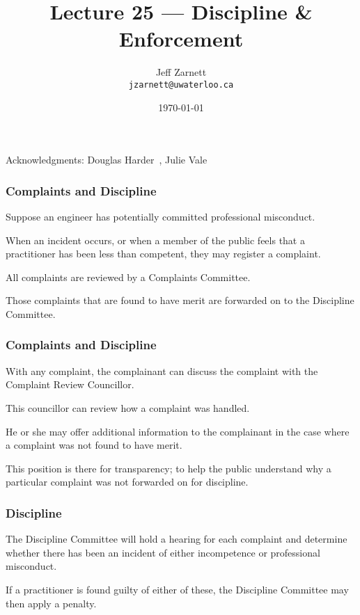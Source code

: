 

\title{Lecture 25 --- Discipline \& Enforcement}

\author{Jeff Zarnett \\ \small \texttt{jzarnett@uwaterloo.ca}}
\date{\today}




\begin{frame}
  \titlepage

\begin{center}
  \small{Acknowledgments: Douglas Harder~\cite{dwh}, Julie Vale~\cite{jv}}
  \end{center}
\end{frame}




\begin{frame}
\frametitle{Complaints and Discipline}

Suppose an engineer has potentially committed professional misconduct.

When an incident occurs, or when a member of the public feels that a practitioner has been less than competent, they may register a complaint.

All complaints are reviewed by a Complaints Committee.

Those complaints that are found to have merit are forwarded on to the Discipline Committee.

\end{frame}



\begin{frame}
\frametitle{Complaints and Discipline}

With any complaint, the complainant can discuss the complaint with the Complaint Review Councillor.

This councillor can review how a complaint was handled.

He or she may offer additional information to the complainant in the case where a complaint was not found to have merit.

This position is there for transparency; to help the public understand why a particular complaint was not forwarded on for discipline.

\end{frame}



\begin{frame}
\frametitle{Discipline}

The Discipline Committee will hold a hearing for each complaint and determine whether there has been an incident of either incompetence or professional misconduct.

If a practitioner is found guilty of either of these, the Discipline Committee may then apply a penalty.


\end{frame}



